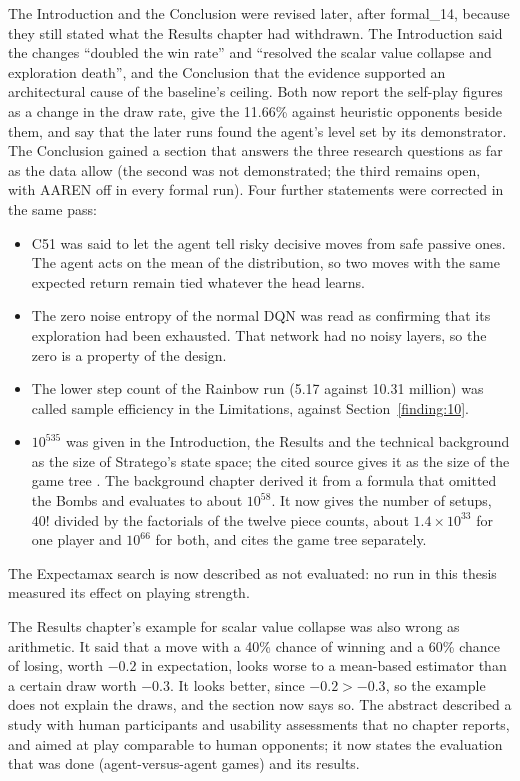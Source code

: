 The Introduction and the Conclusion were revised later, after formal\_14, because they still
stated what the Results chapter had withdrawn. The Introduction said the changes ``doubled the win
rate'' and ``resolved the scalar value collapse and exploration death'', and the Conclusion that
the evidence supported an architectural cause of the baseline's ceiling. Both now report the
self-play figures as a change in the draw rate, give the 11.66\% against heuristic opponents beside
them, and say that the later runs found the agent's level set by its demonstrator. The Conclusion
gained a section that answers the three research questions as far as the data allow (the second
was not demonstrated; the third remains open, with AAREN off in every formal run). Four further
statements were corrected in the same pass:
\begin{itemize}
  \item C51 was said to let the agent tell risky decisive moves from safe passive ones. The agent
        acts on the mean of the distribution, so two moves with the same expected return remain
        tied whatever the head learns.
  \item The zero noise entropy of the normal DQN was read as confirming that its exploration had
        been exhausted. That network had no noisy layers, so the zero is a property of the design.
  \item The lower step count of the Rainbow run (5.17 against 10.31 million) was called sample
        efficiency in the Limitations, against Section~\ref{finding:10}.
  \item $10^{535}$ was given in the Introduction, the Results and the technical background as the
        size of Stratego's state space; the cited source gives it as the size of the game tree
        \cite{perolat2022stratego}. The background chapter derived it from a formula that omitted
        the Bombs and evaluates to about $10^{58}$. It now gives the number of setups, $40!$
        divided by the factorials of the twelve piece counts, about $1.4 \times 10^{33}$ for one
        player and $10^{66}$ for both, and cites the game tree separately.
\end{itemize}
The Expectamax search is now described as not evaluated: no run in this thesis measured its
effect on playing strength.

The Results chapter's example for scalar value collapse was also wrong as arithmetic. It said that
a move with a 40\% chance of winning and a 60\% chance of losing, worth $-0.2$ in expectation,
looks worse to a mean-based estimator than a certain draw worth $-0.3$. It looks better, since
$-0.2 > -0.3$, so the example does not explain the draws, and the section now says so. The abstract
described a study with human participants and usability assessments that no chapter reports, and
aimed at play comparable to human opponents; it now states the evaluation that was done
(agent-versus-agent games) and its results.

